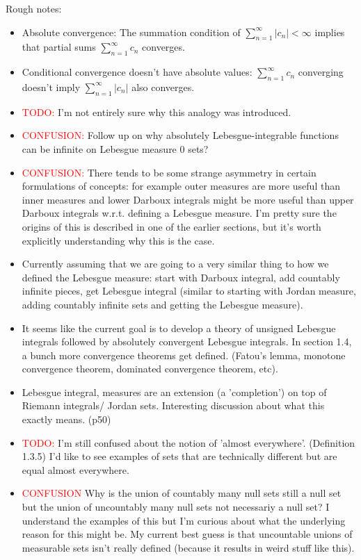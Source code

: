 \documentclass[answers,12pt]{exam}
\begin{document}
Rough notes:
\begin{itemize}[noitemsep]
    \item Absolute convergence: The summation condition of $\sum_{n=1}^{\infty}|c_n| < \infty$ implies that partial sums $\sum_{n=1}^{\infty} c_n$ converges.
    \item Conditional convergence doesn't have absolute values: $\sum_{n=1}^{\infty}c_n$ converging doesn't imply $\sum_{n=1}^{\infty}|c_n|$ also converges.
    \item \textcolor{red}{TODO:} I'm not entirely sure why this analogy was introduced.
    \item \textcolor{red}{CONFUSION:} Follow up on why absolutely Lebesgue-integrable functions can be infinite on Lebesgue measure 0 sets?
    \item \textcolor{red}{CONFUSION:} There tends to be some strange asymmetry in certain formulations of concepts: 
    for example outer measures are more useful than inner measures and lower Darboux integrals might be more useful than upper Darboux integrals w.r.t. defining a Lebesgue measure.
    I'm pretty sure the origins of this is described in one of the earlier sections, but it's worth explicitly understanding why this is the case.
    \item Currently assuming that we are going to a very similar thing to how we defined the Lebesgue measure: start with Darboux integral, add countably infinite pieces, get Lebesgue integral (similar to starting with Jordan measure, adding countably infinite sets and getting the Lebesgue measure).
    \item It seems like the current goal is to develop a theory of unsigned Lebesgue integrals followed by absolutely convergent Lebesgue integrals.
    In section 1.4, a bunch more convergence theorems get defined. 
    (Fatou's lemma, monotone convergence theorem, dominated convergence theorem, etc).
    \item Lebesgue integral, measures are an extension (a 'completion') on top of Riemann integrals/ Jordan sets.
    Interesting discussion about what this exactly means. (p50)
    \item \textcolor{red}{TODO:} I'm still confused about the notion of 'almost everywhere'. (Definition 1.3.5)
    I'd like to see examples of sets that are technically different but are equal almost everywhere.
    \item \textcolor{red}{CONFUSION} Why is the union of countably many null sets still a null set but the union of uncountably many null sets not necessariy a null set?
    I understand the examples of this but I'm curious about what the underlying reason for this might be.
    My current best guess is that uncountable unions of measurable sets isn't really defined (because it results in weird stuff like this).
\end{itemize}
\end{document}

